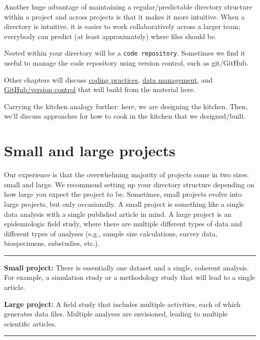 \documentclass[
]{book}
\begin{document}
Another huge advantage of maintaining a regular/predictable directory structure within a project and across projects is that it makes it more intuitive. When a directory is intuitive, it is easier to work collaboratively across a larger team; everybody can predict (at least approximately) where files should be.

Nested within your directory will be a \texttt{code\ repository}. Sometimes we find it useful to manage the code repository using version control, such as git/GitHub.

Other chapters will discuss \hyperref[codingpractices]{coding practices}, \hyperref[datamanagement]{data management}, and \hyperref[github]{GitHub/version control} that will build from the material here.

Carrying the kitchen analogy further: here, we are designing the kitchen. Then, we'll discuss approaches for how to cook in the kitchen that we designed/built.

\section{Small and large projects}\label{small-and-large-projects}

Our experience is that the overwhelming majority of projects come in two sizes: small and large. We recommend setting up your directory structure depending on how large you expect the project to be. Sometimes, small projects evolve into large projects, but only occasionally. A small project is something like a single data analysis with a single published article in mind. A large project is an epidemiologic field study, where there are multiple different types of data and different types of analyses (e.g., sample size calculations, survey data, biospecimens, substudies, etc.).

\begin{center}\rule{0.5\linewidth}{0.5pt}\end{center}

\textbf{Small project:} There is essentially one dataset and a single, coherent analysis. For example, a simulation study or a methodology study that will lead to a single article.

\textbf{Large project:} A field study that includes multiple activities, each of which generates data files. Multiple analyses are envisioned, leading to multiple scientific articles.

\begin{center}\rule{0.5\linewidth}{0.5pt}\end{center}
\end{document}
